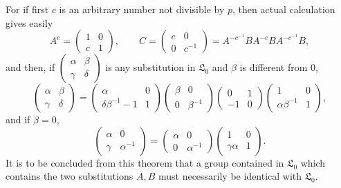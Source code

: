 \documentclass[11pt]{article}
\providecommand{\Lzero}{\mathfrak L_0}
\begin{document}
For if first $c$ is an arbitrary number not divisible by $p$, then actual calculation gives easily
\begin{equation}
 A^c=\begin{pmatrix}1&0\\ c&1\end{pmatrix},
 \qquad
 C=\begin{pmatrix}c&0\\0&c^{-1}\end{pmatrix}
 =A^{-c^{-1}}BA^{-c}BA^{-c^{-1}}B,
\tag{11}
\end{equation}
and then, if $\begin{pmatrix}\alpha&\beta\\\gamma&\delta\end{pmatrix}$ is any substitution in $\Lzero$ and $\beta$ is different from $0$,
\begin{equation}
 \begin{pmatrix}\alpha&\beta\\\gamma&\delta\end{pmatrix}
 =\begin{pmatrix}\alpha&0\\ \delta\beta^{-1}-1&1\end{pmatrix}
 \begin{pmatrix}\beta&0\\0&\beta^{-1}\end{pmatrix}
 \begin{pmatrix}0&1\\-1&0\end{pmatrix}
 \begin{pmatrix}1&0\\ \alpha\beta^{-1}&1\end{pmatrix},
\tag{12}
\end{equation}
and if $\beta=0$,
\begin{equation}
 \begin{pmatrix}\alpha&0\\\gamma&\alpha^{-1}\end{pmatrix}
 =\begin{pmatrix}\alpha&0\\0&\alpha^{-1}\end{pmatrix}
 \begin{pmatrix}1&0\\\gamma\alpha&1\end{pmatrix}.
\tag{13}
\end{equation}
It is to be concluded from this theorem that a group contained in $\Lzero$ which contains the two substitutions $A,B$ must necessarily be identical with $\Lzero$.
\end{document}
